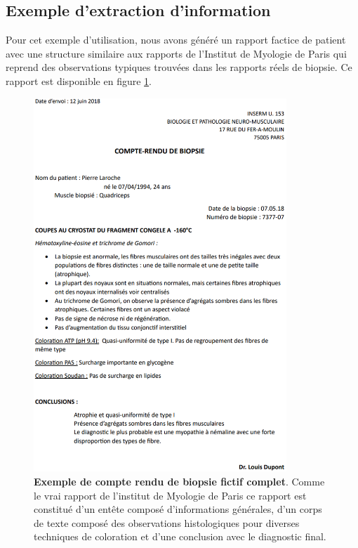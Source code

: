 \subsection{Exemple d'extraction d'information}
Pour cet exemple d'utilisation, nous avons généré un rapport factice de patient avec une structure similaire aux rapports de l'Institut de Myologie de Paris qui reprend des observations typiques trouvées dans les rapports réels de biopsie. Ce rapport est disponible en figure \ref{fig:factice_report}. 
\begin{figure}[!htbp]
 \centering
 \includegraphics[width=0.85\textwidth]{figures/pdf_biopsie.png}
 \caption[Compte rendu de biopsie fictif]{\textbf{Exemple de compte rendu de biopsie fictif complet}. Comme le vrai rapport de l'institut de Myologie de Paris ce rapport est constitué d'un entête composé d'informations générales, d'un corps de texte composé des observations histologiques pour diverses techniques de coloration et d'une conclusion avec le diagnostic final.}
 \label{fig:factice_report}
\end{figure}

